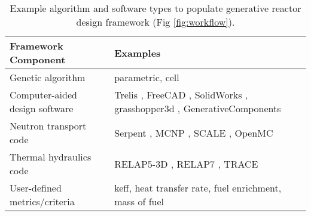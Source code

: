 \documentclass[letterpaper,11pt]{article}
\begin{document}
\begin{table}[!htbp]
        \caption{Example algorithm and software types to populate generative reactor 
        design framework (Fig \ref{fig:workflow}).}
        \label{tab:examples}
        \centering
        \doublespacing
        \small
        \begin{tabular}{lp{10cm}}
        \hline
        \textbf{Framework Component} & \textbf{Examples}\\ \hline
        Genetic algorithm & parametric, cell \cite{renner_genetic_2003} \\
        Computer-aided design software & Trelis \cite{noauthor_trelis_2018}, FreeCAD \cite{falck_freecad_2012}, SolidWorks \cite{lombard_solidworks_2008}, grasshopper3d \cite{rutten_grasshopper3d_2015}, GenerativeComponents \cite{aish_bentleys_2003} \\
        Neutron transport code & Serpent \cite{leppanen_serpent_2014}, MCNP \cite{werner_mcnp6._2018}, SCALE \cite{bucholz_scale:_1982}, OpenMC \cite{romano_openmc_2013} \\ 
        Thermal hydraulics code & RELAP5-3D \cite{strydom_comparison_2016}, RELAP7 \cite{andrs_relap-7_2012}, TRACE \cite{xu_multi-physics_2006}\\
        User-defined metrics/criteria & keff, heat transfer rate, fuel enrichment, mass of fuel \\ \hline
\end{tabular}
\end{table}

\pagebreak


\end{document}
